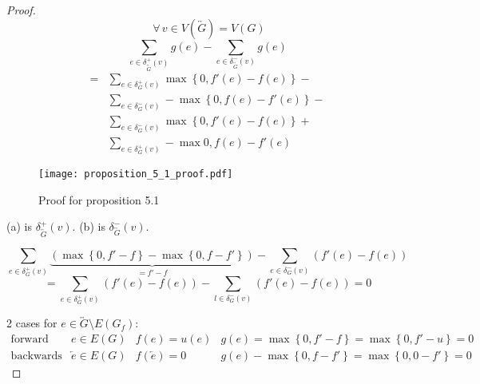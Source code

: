 \documentclass{article}
\newcommand{\set}[1]{\left\{#1\right\}}
\newcommand{\fall}{\;\forall\,}
\begin{document}
\begin{proof}
  \[ \fall v \in V(\overleftrightarrow{G}) = V(G) \]
  \begin{equation*}
    \sum_{e \in \delta^+_{\overleftrightarrow{G}}(v)} g(e) - \sum_{e \in \delta^-_{\overleftrightarrow{G}}(v)} g(e)
  \end{equation*} \begin{align*}
    = &\sum_{e \in \delta^+_{G}(v)} \max\set{0, f'(e) - f(e)} - \\
      &\sum_{e \in \delta^-_G(v)} -\max\set{0, f(e) - f'(e)} - \\
      &\sum_{e \in \delta^-_G(v)} \max\set{0, f'(e) - f(e)} + \\
      &\sum_{e \in \delta^+_G(v)} -\max{0, f(e) - f'(e)}
  \end{align*}

  \begin{figure}[h]
   \begin{center}
    \texttt{[image: proposition\_5\_1\_proof.pdf]}
    \caption{Proof for proposition 5.1}
   \end{center}
  \end{figure}

  (a) is $\delta^+_{\overleftrightarrow{G}}(v)$. (b) is $\delta^-_{\overleftrightarrow{G}}(v)$.

  \[
    \sum_{e \in \delta^+_G(v)} \underbrace{\left(\max\set{0, f' - f} - \max\set{0, f - f'}\right)}_{= f' - f} - \sum_{e \in \delta^-_G(v)} \left(f'(e) - f(e)\right)
  \] \[
      = \sum_{e \in \delta^+_G(v)} \left(f'(e) - f(e)\right) - \sum_{l \in \delta^-_G(v)} \left(f'(e) - f(e)\right)
      = 0
  \]

  2 cases for $e \in \overleftrightarrow{G} \setminus E(G_f)$:
  \[
    \begin{array}{llll}
      \text{forward edge} & e \in E(G) & f(e) = u(e) & g(e) = \max\set{0, f' - f} = \max\set{0, f' - u} = 0 \\
      \text{backwards edge} & \overleftarrow{e} \in E(G) & f(\overleftarrow{e}) = 0 & g(e) - \max\set{0, f - f'} = \max\set{0, 0 - f'} = 0
    \end{array}
  \]
\end{proof}
\end{document}
